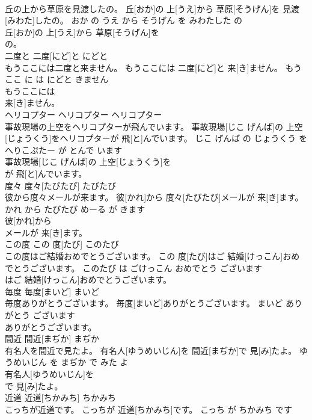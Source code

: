 \documentclass[8pt]{extreport}
\begin{document}
\begin{CJK}{UTF8}{min}
\\	丘の上から草原を見渡したの。	丘[おか]の 上[うえ]から 草原[そうげん]を 見渡[みわた]したの。	おか の うえ から そうげん を みわたした の	
\\	丘[おか]の 上[うえ]から 草原[そうげん]を
\\	の。			
\\	二度と	二度[にど]と	にどと	
\\	もうここには二度と来ません。	もうここには 二度[にど]と 来[き]ません。	もう ここ に は にどと きません	
\\	もうここには
\\	来[き]ません。			
\\	ヘリコプター	ヘリコプター	ヘリコプター	
\\	事故現場の上空をヘリコプターが飛んでいます。	事故現場[じこ げんば]の 上空[じょうくう]をヘリコプターが 飛[と]んでいます。	じこ げんば の じょうくう を へりこぷたー が とんで います	
\\	事故現場[じこ げんば]の 上空[じょうくう]を
\\	が 飛[と]んでいます。			
\\	度々	度々[たびたび]	たびたび	
\\	彼から度々メールが来ます。	彼[かれ]から 度々[たびたび]メールが 来[き]ます。	かれ から たびたび めーる が きます	
\\	彼[かれ]から
\\	メールが 来[き]ます。			
\\	この度	この 度[たび]	このたび	
\\	この度はご結婚おめでとうございます。	この 度[たび]はご 結婚[けっこん]おめでとうございます。	このたび は ごけっこん おめでとう ございます	
\\	はご 結婚[けっこん]おめでとうございます。			
\\	毎度	毎度[まいど]	まいど	
\\	毎度ありがとうございます。	毎度[まいど]ありがとうございます。	まいど ありがとう ございます	
\\	ありがとうございます。			
\\	間近	間近[まぢか]	まぢか	
\\	有名人を間近で見たよ。	有名人[ゆうめいじん]を 間近[まぢか]で 見[み]たよ。	ゆうめいじん を まぢか で みた よ	
\\	有名人[ゆうめいじん]を
\\	で 見[み]たよ。			
\\	近道	近道[ちかみち]	ちかみち	
\\	こっちが近道です。	こっちが 近道[ちかみち]です。	こっち が ちかみち です	

\end{CJK}
\end{document}
